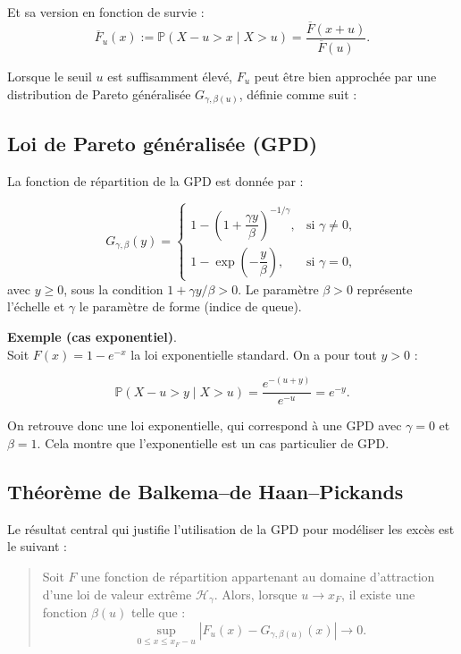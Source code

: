 \documentclass{article}
\begin{document}
Et sa version en fonction de survie :
\[
\overline{F}_u(x) := \mathbb{P}(X - u > x \mid X > u) = \frac{\overline{F}(x + u)}{\overline{F}(u)}.
\]

Lorsque le seuil \(u\) est suffisamment élevé, \(F_u\) peut être bien approchée par une distribution de Pareto généralisée \(G_{\gamma, \beta(u)}\), définie comme suit :

\subsection{Loi de Pareto généralisée (GPD)}

La fonction de répartition de la GPD est donnée par :

\[
G_{\gamma, \beta}(y) =
\begin{cases}
1 - \left(1 + \dfrac{\gamma y}{\beta}\right)^{-1/\gamma}, & \text{si } \gamma \neq 0, \\
1 - \exp\left(-\dfrac{y}{\beta}\right), & \text{si } \gamma = 0,
\end{cases}
\]
avec \( y \geq 0 \), sous la condition \(1 + \gamma y/\beta > 0\). Le paramètre \(\beta > 0\) représente l’échelle et \(\gamma\) le paramètre de forme (indice de queue).

\medskip
\textbf{Exemple (cas exponentiel)}.\\
Soit \(F(x) = 1 - e^{-x}\) la loi exponentielle standard. On a pour tout \(y > 0\) :

\[
\mathbb{P}(X - u > y \mid X > u) = \frac{e^{-(u + y)}}{e^{-u}} = e^{-y}.
\]

On retrouve donc une loi exponentielle, qui correspond à une GPD avec \(\gamma = 0\) et \(\beta = 1\). Cela montre que l’exponentielle est un cas particulier de GPD.

\subsection{Théorème de Balkema–de Haan–Pickands}

Le résultat central qui justifie l’utilisation de la GPD pour modéliser les excès est le suivant :

\begin{quote}
Soit \(F\) une fonction de répartition appartenant au domaine d’attraction d’une loi de valeur extrême \(\mathcal{H}_\gamma\). Alors, lorsque \(u \to x_F\), il existe une fonction \(\beta(u)\) telle que :
\[
\sup_{0 \leq x \leq x_F - u} \left| F_u(x) - G_{\gamma, \beta(u)}(x) \right| \to 0.
\]
\end{quote}
\end{document}
